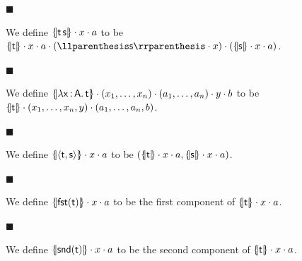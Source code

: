  
\par\noindent  $\blacksquare$ 
 
We define $\{\hskip-2.25pt|\mathsf{t}\,\mathsf{s}|\hskip-2.25pt\}\cdot x\cdot a$ to be $\{\hskip-2.25pt|\mathsf{t}|\hskip-2.25pt\}\cdot x\cdot a\cdot(\llparenthesis%
\mathsf{s}\rrparenthesis\cdot x)\cdot(\{\hskip-2.25pt|\mathsf{s}|\hskip-2.25pt%
\}\cdot x\cdot a)$.\par
 
 
 
\par\noindent  $\blacksquare$ 
 
We define $\{\hskip-2.25pt|\lambda\mathsf{x}\,{:}\,\mathsf{A}.\,\mathsf{t}|\hskip-2.25pt%
\}\cdot(x_{1},\ldots,x_{n})\cdot(a_{1},\ldots,a_{n})\cdot y\cdot b$ to be $\{\hskip-2.25pt|\mathsf{t}|\hskip-2.25pt\}\cdot(x_{1},\ldots,x_{n},y)\cdot(a_{%
1},\ldots,a_{n},b)$.\par
 
 
 
\par\noindent  $\blacksquare$ 
 
We define $\{\hskip-2.25pt|\langle\mathsf{t},\mathsf{s}\rangle|\hskip-2.25pt\}\cdot x\cdot
a$ to be $(\{\hskip-2.25pt|\mathsf{t}|\hskip-2.25pt\}\cdot x\cdot a,\{\hskip-2.25pt|%
\mathsf{s}|\hskip-2.25pt\}\cdot x\cdot a)$.\par
 
 
 
\par\noindent  $\blacksquare$ 
 
We define $\{\hskip-2.25pt|\mathsf{fst}(\mathsf{t})|\hskip-2.25pt\}\cdot x\cdot a$ to be the first component of $\{\hskip-2.25pt|\mathsf{t}|\hskip-2.25pt\}\cdot x\cdot a$.\par
 
 
 
\par\noindent  $\blacksquare$ 
 
We define $\{\hskip-2.25pt|\mathsf{snd}(\mathsf{t})|\hskip-2.25pt\}\cdot x\cdot a$ to be the second component of $\{\hskip-2.25pt|\mathsf{t}|\hskip-2.25pt\}\cdot x\cdot a$.\par
 
 
  
 
 
